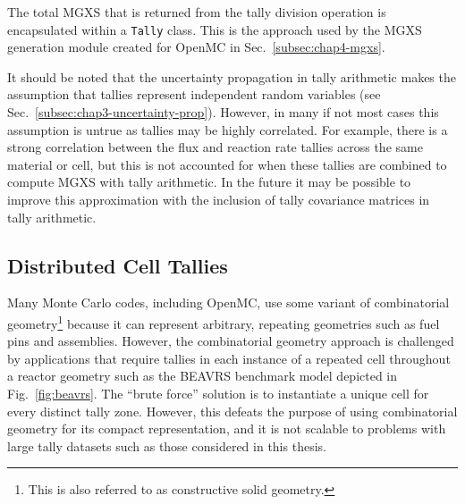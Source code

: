 \noindent The total \ac{MGXS} that is returned from the tally division operation is encapsulated within a \texttt{Tally} class. This is the approach used by the \ac{MGXS} generation module created for OpenMC in Sec.~\ref{subsec:chap4-mgxs}.

It should be noted that the uncertainty propagation in tally arithmetic makes the assumption that tallies represent independent random variables (see Sec.~\ref{subsec:chap3-uncertainty-prop}). However, in many if not most cases this assumption is untrue as tallies may be highly correlated. For example, there is a strong correlation between the flux and reaction rate tallies across the same material or cell, but this is not accounted for when these tallies are combined to compute \ac{MGXS} with tally arithmetic. In the future it may be possible to improve this approximation with the inclusion of tally covariance matrices in tally arithmetic.

\subsection{Distributed Cell Tallies}
\label{subsec:chap4-distribcells}

Many Monte Carlo codes, including OpenMC, use some variant of combinatorial geometry\footnote{This is also referred to as constructive solid geometry.} because it can represent arbitrary, repeating geometries such as fuel pins and assemblies. However, the combinatorial geometry approach is challenged by applications that require tallies in each instance of a repeated cell throughout a reactor geometry such as the \ac{BEAVRS} benchmark model depicted in Fig.~\ref{fig:beavrs}. The ``brute force'' solution is to instantiate a unique cell for every distinct tally zone. However, this defeats the purpose of using combinatorial geometry for its compact representation, and it is not scalable to problems with large tally datasets such as those considered in this thesis.

